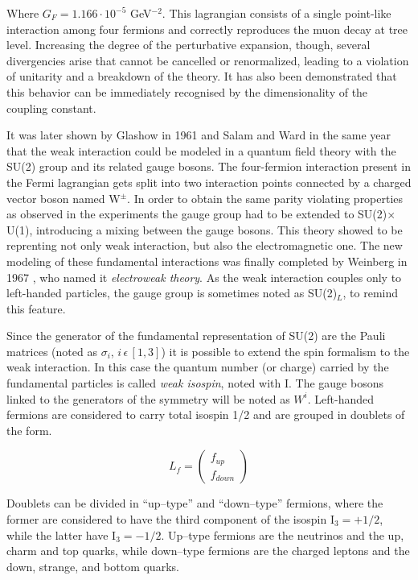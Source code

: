 Where $G_F = 1.166 \cdot 10^{-5}$ GeV$^{-2}$. This lagrangian consists of a single point-like interaction among four fermions and correctly reproduces the muon decay at tree level. Increasing the degree of the perturbative expansion, though, several divergencies arise that cannot be cancelled or renormalized, leading to a violation of unitarity and a breakdown of the theory. It has also been demonstrated that this behavior can be immediately recognised by the dimensionality of the coupling constant.

It was later shown by Glashow in 1961 \cite{Glashow:1961tr} and Salam and Ward \cite{Salam:1961en} in the same year that the weak interaction could be modeled in a quantum field theory with the SU(2) group and its related gauge bosons. 
The four-fermion interaction present in the Fermi lagrangian gets split into two interaction points connected by a charged vector boson named W$^\pm$. In order to obtain the same parity violating properties as observed in the experiments the gauge group had to be extended to SU(2)$\times$U(1), introducing a mixing between the gauge bosons. This theory showed to be reprenting not only weak interaction, but also the electromagnetic one. 
The new modeling of these fundamental interactions was finally completed by Weinberg in 1967 \cite{Weinberg:1967tq}, who named it \emph{electroweak theory}. 
As the weak interaction couples only to left-handed particles, the gauge group is sometimes noted as SU(2)$_L$, to remind this feature.

Since the generator of the fundamental representation of SU(2) are the Pauli matrices (noted as $\sigma_i$, $i \, \epsilon \, [1,3]$) it is possible to extend the spin formalism to the weak interaction. In this case the quantum number (or charge) carried by the fundamental particles is called \emph{weak isospin}, noted with I. The gauge bosons linked to the generators of the symmetry will be noted as $W^i$. Left-handed fermions are considered to carry total isospin 1/2 and are grouped in doublets of the form.

\begin{equation}
L_f = \left(\begin{array}{c}f_{up} \\f_{down}\end{array}\right)
\end{equation}

Doublets can be divided in ``up--type'' and ``down--type'' fermions, where the former are considered to have the third component of the isospin I$_3 = +1/2$, while the latter have I$_3 = -1/2$. Up--type fermions are the neutrinos and the up, charm and top quarks, while down--type fermions are the charged leptons and the down, strange, and bottom quarks.

